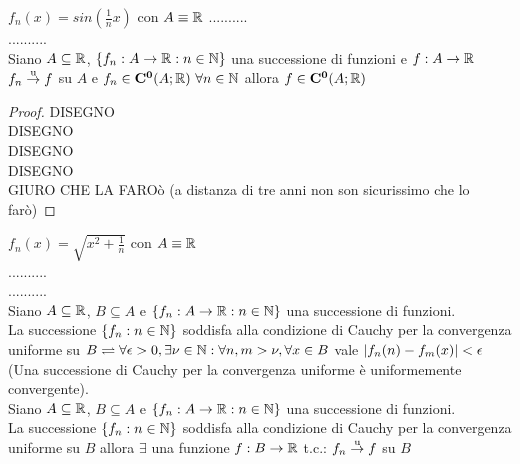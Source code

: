 \example $f_n(x)=sin\left(\frac{1}{n}x\right)$ con $A\equiv \mathbb{R}$
..........\\
..........\\
\proposition
Siano $A\subseteq \mathbb{R}$, $\left\{f_n:A\to \mathbb{R}:n\in\mathbb{N}\right\}$ una successione di funzioni e $f:A\to \mathbb{R}$\\
$f_n \overset{\text{u}}{\to} f$ su $A$ e $f_n\in \mathbf{C^{0}}(A; \mathbb{R})\,\,\forall n\in\mathbb{N}$ allora $f\in \mathbf{C^{0}}(A; \mathbb{R})$
\begin{proof}
	DISEGNO\\
	DISEGNO\\
	DISEGNO\\
	DISEGNO\\
	GIURO CHE LA FAROò
	(a distanza di tre anni non son sicurissimo che lo farò)
\end{proof}
\example $f_n(x)=\sqrt{x^2+\frac{1}{n}}$ con $A\equiv \mathbb{R}$\\
..........\\
..........\\
Siano $A\subseteq \mathbb{R}$, $B\subseteq A$ e $\left\{f_n:A\to \mathbb{R}:n\in\mathbb{N}\right\}$ una successione di funzioni.\\
La successione $\left\{f_n:n\in\mathbb{N}\right\}$ soddisfa alla condizione di Cauchy per la convergenza uniforme su $B \rightleftharpoons \forall\epsilon>0, \exists\nu\in\mathbb{N}: \forall n,m>\nu, \forall x \in B$ vale $\left|f_n(n)-f_m(x)\right|<\epsilon$
\proposition
(Una successione di Cauchy per la convergenza uniforme è uniformemente convergente).\\
Siano $A\subseteq \mathbb{R}$, $B\subseteq A$ e $\left\{ f_n:A\to \mathbb{R}:n\in\mathbb{N} \right\}$ una successione di funzioni.\\
La successione $\left\{ f_n:n\in\mathbb{N} \right\}$ soddisfa alla condizione di Cauchy per la convergenza uniforme su $B$ allora $\exists$ una funzione $f:B\to \mathbb{R}$ t.c.: $f_n \overset{\text{u}}{\to} f$ su $B$
